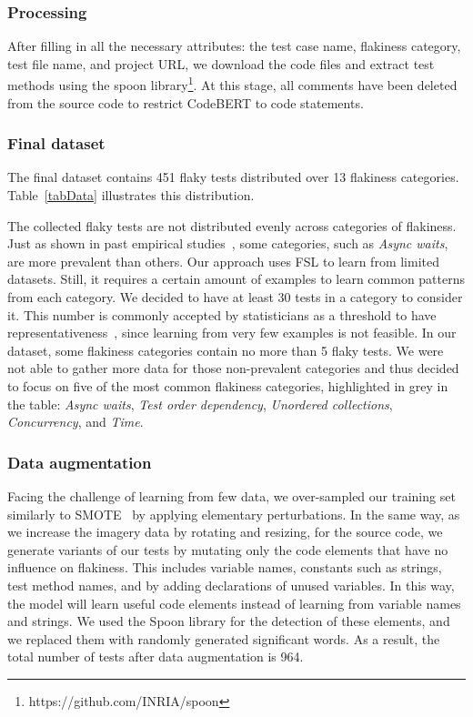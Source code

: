 \subsubsection{Processing}
After filling in all the necessary attributes: the test case name, flakiness category, test file name, and project URL, we download the code files and extract test methods using the spoon library\footnote{https://github.com/INRIA/spoon}. At this stage, all comments have been deleted from the source code to restrict CodeBERT to code statements.

\subsubsection{Final dataset}

The final dataset contains 451 flaky tests distributed over 13 flakiness categories.
Table~\ref{tabData} illustrates this distribution.

The collected flaky tests are not distributed evenly across categories of flakiness. Just as shown in past empirical studies~\cite{Luo2014,Gruber2021}, some categories, such as \textit{Async waits}, are more prevalent than others. 
Our approach uses FSL to learn from limited datasets. 
Still, it requires a certain amount of examples to learn common patterns from each category. 
We decided to have at least 30 tests in a category to consider it. This number is commonly accepted by statisticians as a threshold to have representativeness~\cite{why30}, since learning from very few examples is not feasible. In our dataset, some flakiness categories contain no more than 5 flaky tests. We were not able to gather more data for those non-prevalent categories and thus decided to focus on five of the most common flakiness categories, highlighted in grey in the table: \textit{Async waits}, \textit{Test order dependency}, \textit{Unordered collections}, \textit{Concurrency}, and \textit{Time}.


\subsubsection{Data augmentation}
Facing the challenge of learning from few data, we over-sampled our training set similarly to SMOTE~\cite{smote} by applying elementary perturbations. In the same way, as we increase the imagery data by rotating and resizing, for the source code, we generate variants of our tests by mutating only the code elements that have no influence on flakiness. This includes variable names, constants such as strings, test method names, and by adding declarations of unused variables. In this way, the model will learn useful code elements instead of learning from variable names and strings. We used the Spoon library for the detection of these elements, and we replaced them with randomly generated significant words. As a result, the total number of tests after data augmentation is 964. 


